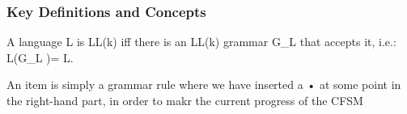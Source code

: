 \subsubsection{Key Definitions and Concepts}
A language L is LL(k) iff there is an LL(k) grammar G_L that accepts it, i.e.: L(G_L )= L.

An item is simply a grammar rule where we have inserted a • at some point in the right-hand part,
in order to makr the current progress of the CFSM